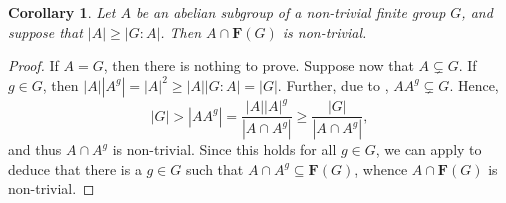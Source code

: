 \documentclass[12pt]{article}
\theoremstyle{thmstyle}
\theoremstyle{defstyle}
\newtheorem{corollary}[theorem]{Corollary}
\renewcommand{\ge}{\geqslant}
\newcommand{\bfF}{\mathbf{F}} %
\begin{document}
\begin{corollary}
    Let $A$ be an abelian subgroup of a non-trivial finite group $G$, and suppose that $|A|\ge |G : A|$. Then $A\cap\bfF(G)$ is non-trivial.
\end{corollary}
\begin{proof}
    If $A = G$, then there is nothing to prove. Suppose now that $A\subsetneq G$. If $g\in G$, then $|A||A^g| = |A|^2\ge |A||G : A| = |G|$. Further, due to , $AA^g\subsetneq G$. Hence, 
    \begin{equation*}
        |G| > |AA^g| = \frac{|A||A|^g}{|A\cap A^g|}\ge\frac{|G|}{|A\cap A^g|},
    \end{equation*}
    and thus $A\cap A^g$ is non-trivial. Since this holds for all $g\in G$, we can apply  to deduce that there is a $g\in G$ such that $A\cap A^g\subseteq\bfF(G)$, whence $A\cap\bfF(G)$ is non-trivial.
\end{proof}
\end{document}
